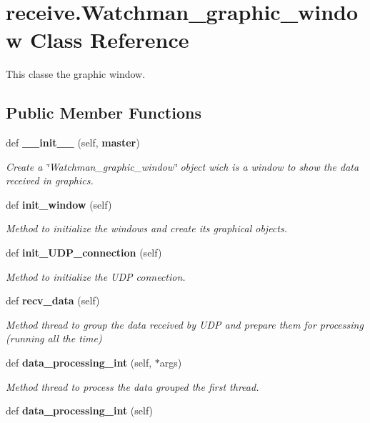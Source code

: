 \section{receive.\+Watchman\+\_\+graphic\+\_\+window Class Reference}
\label{classreceive_1_1_watchman__graphic__window}


This classe the graphic window.  


\subsection*{Public Member Functions}
\begin{DoxyCompactItemize}
\item 
def \textbf{ \+\_\+\+\_\+init\+\_\+\+\_\+} (self, \textbf{ master})
\begin{DoxyCompactList}\small\item\em Create a \char`\"{}\+Watchman\+\_\+graphic\+\_\+window\char`\"{} object wich is a window to show the data received in graphics. \end{DoxyCompactList}\item 
def \textbf{ init\+\_\+window} (self)
\begin{DoxyCompactList}\small\item\em Method to initialize the windows and create its graphical objects. \end{DoxyCompactList}\item 
def \textbf{ init\+\_\+\+U\+D\+P\+\_\+connection} (self)
\begin{DoxyCompactList}\small\item\em Method to initialize the U\+DP connection. \end{DoxyCompactList}\item 
def \textbf{ recv\+\_\+data} (self)
\begin{DoxyCompactList}\small\item\em Method thread to group the data received by U\+DP and prepare them for processing (running all the time) \end{DoxyCompactList}\item 
def \textbf{ data\+\_\+processing\+\_\+int} (self, $\ast$args)
\begin{DoxyCompactList}\small\item\em Method thread to process the data grouped the first thread. \end{DoxyCompactList}\item 
def \textbf{ data\+\_\+processing\+\_\+int} (self)

\end{DoxyCompactItemize}
